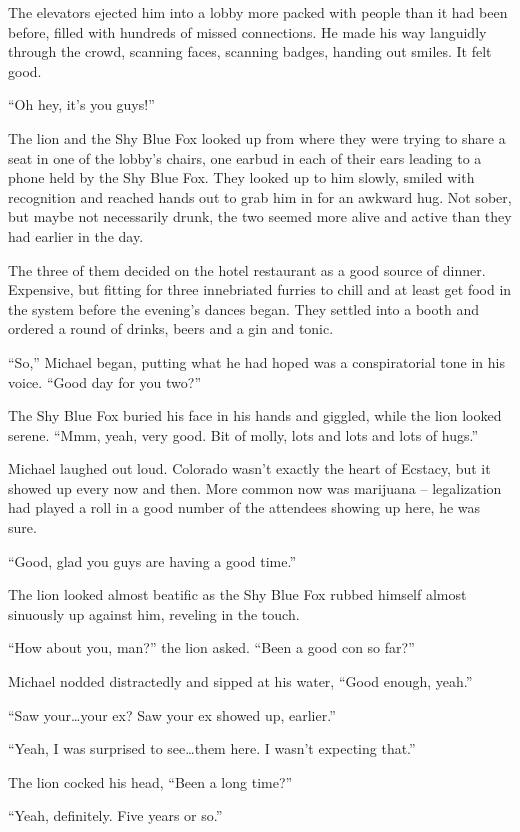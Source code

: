 The elevators ejected him into a lobby more packed with people than it had been before, filled with hundreds of missed connections. He made his way languidly through the crowd, scanning faces, scanning badges, handing out smiles. It felt good.

``Oh hey, it's you guys!''

The lion and the Shy Blue Fox looked up from where they were trying to share a seat in one of the lobby's chairs, one earbud in each of their ears leading to a phone held by the Shy Blue Fox. They looked up to him slowly, smiled with recognition and reached hands out to grab him in for an awkward hug. Not sober, but maybe not necessarily drunk, the two seemed more alive and active than they had earlier in the day.

The three of them decided on the hotel restaurant as a good source of dinner. Expensive, but fitting for three innebriated furries to chill and at least get food in the system before the evening's dances began. They settled into a booth and ordered a round of drinks, beers and a gin and tonic.

``So,'' Michael began, putting what he had hoped was a conspiratorial tone in his voice. ``Good day for you two?''

The Shy Blue Fox buried his face in his hands and giggled, while the lion looked serene. ``Mmm, yeah, very good. Bit of molly, lots and lots and lots of hugs.''

Michael laughed out loud. Colorado wasn't exactly the heart of Ecstacy, but it showed up every now and then. More common now was marijuana -- legalization had played a roll in a good number of the attendees showing up here, he was sure.

``Good, glad you guys are having a good time.''

The lion looked almost beatific as the Shy Blue Fox rubbed himself almost sinuously up against him, reveling in the touch.

``How about you, man?'' the lion asked. ``Been a good con so far?''

Michael nodded distractedly and sipped at his water, ``Good enough, yeah.''

``Saw your\ldots{}your ex? Saw your ex showed up, earlier.''

``Yeah, I was surprised to see\ldots{}them here. I wasn't expecting that.''

The lion cocked his head, ``Been a long time?''

``Yeah, definitely. Five years or so.''

